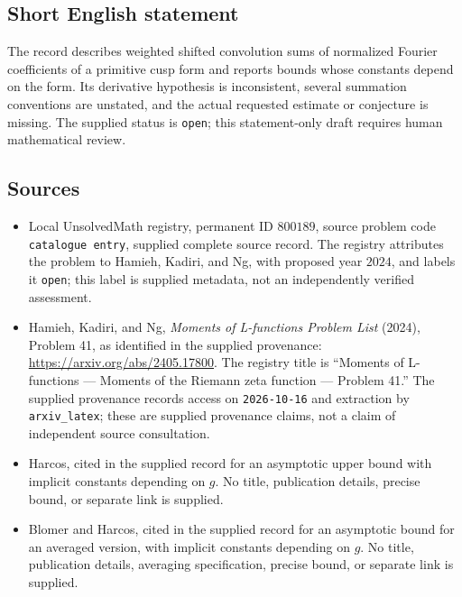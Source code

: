 \documentclass[11pt]{article}
\begin{document}
\subsection{Short English statement}
The record describes weighted shifted convolution sums of normalized Fourier coefficients of a primitive cusp form and reports bounds whose constants depend on the form. Its derivative hypothesis is inconsistent, several summation conventions are unstated, and the actual requested estimate or conjecture is missing. The supplied status is \texttt{open}; this statement-only draft requires human mathematical review.
\subsection{Sources}
\begin{itemize}
\item Local UnsolvedMath registry, permanent ID \(800189\), source problem code \texttt{catalogue entry}, supplied complete source record. The registry attributes the problem to Hamieh, Kadiri, and Ng, with proposed year \(2024\), and labels it \texttt{open}; this label is supplied metadata, not an independently verified assessment.
\item Hamieh, Kadiri, and Ng, \emph{Moments of L-functions Problem List} (2024), Problem 41, as identified in the supplied provenance: \url{https://arxiv.org/abs/2405.17800}. The registry title is ``Moments of L-functions --- Moments of the Riemann zeta function --- Problem 41.'' The supplied provenance records access on \texttt{2026-10-16} and extraction by \texttt{arxiv\_latex}; these are supplied provenance claims, not a claim of independent source consultation.
\item [Harcos] Harcos, cited in the supplied record for an asymptotic upper bound with implicit constants depending on \(g\). No title, publication details, precise bound, or separate link is supplied.
\item [BH] Blomer and Harcos, cited in the supplied record for an asymptotic bound for an averaged version, with implicit constants depending on \(g\). No title, publication details, averaging specification, precise bound, or separate link is supplied.
\end{itemize}
\end{document}
